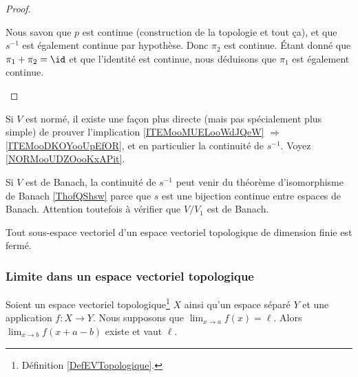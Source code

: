 \begin{proof}
\begin{subproof}
		Nous savon que \( p\) est continue (construction de la topologie et tout ça), et que \( s^{-1}\) est également continue par hypothèse. Donc \( \pi_2\) est continue. Étant donné que \( \pi_1+\pi_2=\id\) et que l'identité est continue, nous déduisons que \( \pi_1\) est également continue.
	\end{subproof}
\end{proof}


\begin{normaltext}
	Si \( V\) est normé, il existe une façon plus directe (mais pas spécialement plus simple) de prouver l'implication \ref{ITEMooMUELooWdJQeW} \( \Rightarrow\) \ref{ITEMooDKOYooUpEfOR}, et en particulier la continuité de \( s^{-1}\). Voyez \ref{NORMooUDZOooKxAPit}.

	Si \( V\) est de Banach, la continuité de \( s^{-1}\) peut venir du théorème d'isomorphisme de Banach \ref{ThofQShsw} parce que \( s\) est une bijection continue entre espaces de Banach. Attention toutefois à vérifier que \( V/V_1\) est de Banach.
\end{normaltext}


\begin{corollary}	\label{CORooJHSGooUkGepQ}
	Tout sous-espace vectoriel d'un espace vectoriel topologique de dimension finie est fermé.
\end{corollary}


\subsubsection{Limite dans un espace vectoriel topologique}


\begin{lemma}      \label{LEMooAHIGooJhpPvo}
	Soient un espace vectoriel topologique\footnote{Définition \ref{DefEVTopologique}.} \( X\) ainsi qu'un espace séparé \( Y\) et une application \( f\colon X\to Y\). Nous supposons que \( \lim_{x\to a}f(x)=\ell\). Alors \( \lim_{x\to b} f(x+a-b)\) existe et vaut \( \ell\).
\end{lemma}

